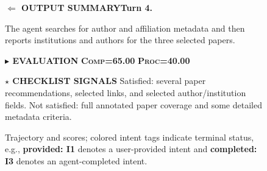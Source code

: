 \documentclass{llmxive}
\providecommand{\caseZhanghaoranOneTag}[3]{    {\setlength{\fboxsep}{1.6pt}\colorbox{#1}{\scriptsize\textbf{#3}}}}
\providecommand{\caseZhanghaoranOneLine}[3]{    \caseZhanghaoranOneTag{#1}{#2}{#3}\hspace{3pt}}
\providecommand{\caseZhanghaoranOneIO}[3]{    \vspace{2pt}
    \noindent\caseZhanghaoranOneLine{#1}{white}{#2}\textbf{#3}
}
\begin{document}
\begin{figure}[!htbp]
{    \caseZhanghaoranOneIO{green!45!black}{$\Leftarrow$ OUTPUT SUMMARY}{Turn 4.}
    The agent searches for author and affiliation metadata and then reports institutions and authors for the three selected papers.

    \vspace{5pt}
    \caseZhanghaoranOneLine{purple!70!black}{white}{$\blacktriangleright$ EVALUATION}
    \caseZhanghaoranOneTag{orange!15}{orange!80!black}{\textsc{Comp}=65.00}
    \hspace{3pt}
    \caseZhanghaoranOneTag{cyan!15}{cyan!45!black}{\textsc{Proc}=40.00}

    \vspace{3pt}
    \noindent\caseZhanghaoranOneLine{orange!80!black}{white}{$\star$ CHECKLIST SIGNALS}
    Satisfied: several paper recommendations, selected links, and selected author/institution fields.
    Not satisfied: full annotated paper coverage and some detailed metadata criteria.
    }
    \caption{Trajectory and scores; colored intent tags indicate terminal status, e.g., \caseZhanghaoranOneTag{red!15}{red!70!black}{provided: I1} denotes a user-provided intent and \caseZhanghaoranOneTag{green!12}{green!45!black}{completed: I3} denotes an agent-completed intent.}
    \label{fig:case_zhanghaoran_1_hidden_intent_resolution}
\end{figure}
\end{document}
